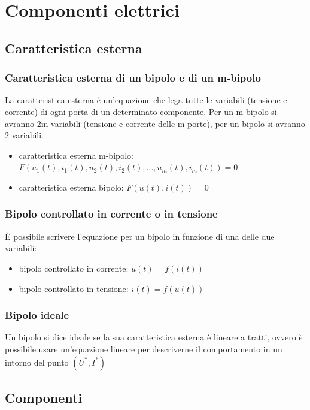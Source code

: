 \documentclass[a4paper]{article}
\begin{document}
\newpage

\section{Componenti elettrici}
\subsection{Caratteristica esterna}
\subsubsection*{Caratteristica esterna di un bipolo e di un m-bipolo}
La caratteristica esterna è un'equazione che lega tutte le variabili (tensione e corrente) di ogni porta di un determinato
componente. Per un m-bipolo si avranno 2m variabili (tensione e corrente delle m-porte), per un bipolo si avranno 2 variabili.
\begin{itemize}
	\item caratteristica esterna m-bipolo: \(F(u_1(t), i_1(t), u_2(t), i_2(t),\dots, u_m(t), i_m(t)) = 0\)
	\item caratteristica esterna bipolo: \(F(u(t), i(t)) = 0\)
\end{itemize}

\subsubsection*{Bipolo controllato in corrente o in tensione}
È possibile scrivere l'equazione per un bipolo in funzione di una delle due variabili:
\begin{itemize}
	\item bipolo controllato in corrente: \(u(t) = f(i(t))\)
	\item bipolo controllato in tensione: \(i(t) = f(u(t))\)
\end{itemize}

\subsubsection*{Bipolo ideale}
Un bipolo si dice ideale se la sua caratteristica esterna è lineare a tratti, ovvero è possibile usare un'equazione lineare per
descriverne il comportamento in un intorno del punto \((U^*, I^*)\)

\subsection{Componenti}
\end{document}
